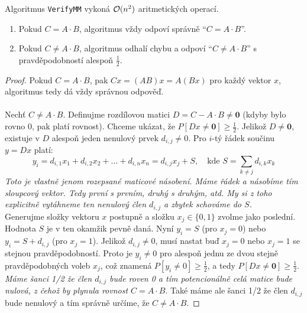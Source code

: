 \begin{theorem}
Algoritmus \texttt{VerifyMM} vykoná $\mathcal{O}(n^2)$ aritmetických operací.
\begin{enumerate}
    \item Pokud $C = A \cdot B$, algoritmus vždy odpoví správně ``$C = A \cdot B$''.
    \item Pokud $C \neq A \cdot B$, algoritmus odhalí chybu a odpoví ``$C \neq A \cdot B$'' s pravděpodobností alespoň $\frac{1}{2}$.
\end{enumerate}
\end{theorem}

\begin{proof}
Pokud $C = A \cdot B$, pak $C x = (AB) x = A(Bx)$ pro každý vektor $x$, algoritmus tedy dá vždy správnou odpověď. \\\\
Nechť $C \neq A \cdot B$. Definujme rozdílovou matici $D = C - A \cdot B \neq \mathbf{0}$ (kdyby bylo rovno 0, pak platí rovnost). Chceme ukázat, že $P[D x \neq \mathbf{0}] \ge \frac{1}{2}$.
Jelikož $D \neq \mathbf{0}$, existuje v $D$ alespoň jeden nenulový prvek $d_{i, j} \neq 0$. Pro $i$-tý řádek součinu $y = D x$ platí:
$$y_i = d_{i, 1} x_1 + d_{i, 2} x_2 + \dots + d_{i, n} x_n = d_{i, j} x_j + S, \quad \text{kde } S = \sum_{k \neq j} d_{i, k} x_k$$
\textit{Toto je vlastně jenom rozepsané maticové násobení. Máme řádek a násobíme tím sloupcový vektor. Tedy první s prvním, druhý s druhým, atd. My si z toho explicitně vytáhneme ten nenulový člen $d_{i,j}$ a zbytek schováme do $S$.} \\

\noindent Generujme složky vektoru $x$ postupně a složku $x_j \in \{0, 1\}$ zvolme jako poslední. Hodnota $S$ je v ten okamžik pevně daná.
Nyní $y_i = S$ (pro $x_j = 0$) nebo $y_i = S + d_{i, j}$ (pro $x_j = 1$). Jelikož $d_{i, j} \neq 0$, musí nastat buď $x_j = 0$ nebo $x_j = 1$ se stejnou pravděpodobností.
Proto je $y_i \neq 0$ pro alespoň jednu ze dvou stejně pravděpodobných voleb $x_j$, což znamená $P[y_i \neq 0] \ge \frac{1}{2}$, a tedy $P[Dx \neq \mathbf{0}] \ge \frac{1}{2}$. \\

\noindent \textit{Máme šanci 1/2 že člen $d_{i,j}$ bude roven 0 a tím potencionálně celá matice bude nulová, z čehož by plynula rovnost $C = A \cdot B$}. Také máme ale šanci 1/2 že člen $d_{i,j}$ bude nenulový a tím správně určíme, že $C \neq A \cdot B$.
\end{proof}

